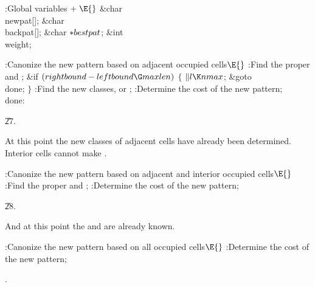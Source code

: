\B{}:Global variables\X${}\mathrel+\E{}$\6
\&{char} \\{newpat}[];\6
\&{char} \\{backpat}[];\6
\&{char} ${}{*}\\{bestpat}{}$;\6
\&{int} \\{weight};\par
\fi

\B{}:Canonize the new pattern based on adjacent
occupied cells\X${}\E{}$\6
:Find the proper  and \X;\6
\&{if} ${}(\\{rightbound}-\\{leftbound}\G\\{maxlen}){}$\5
${}\{{}$\1\6
${}\|l\K\\{nmax}{}$;\5
\&{goto} \\{done};\6
\4${}\}{}$\2\6
:Find the new classes, or \X;\6
:Determine the cost of the new pattern\X;\6
\4\\{done}:\par
\U27.\fi

At this point the new classes of adjacent cells have
already been determined.
Interior cells cannot make .

\Y\B\4:Canonize the new pattern based on adjacent and interior occupied
cells\X${}\E{}$\6
:Find the proper  and \X;\6
:Determine the cost of the new pattern\X;\par
\U28.\fi

And at this point the  and  are already known.

\Y\B\4:Canonize the new pattern based on all occupied cells\X${}\E{}$\6
:Determine the cost of the new pattern\X;\par
{}.\fi

